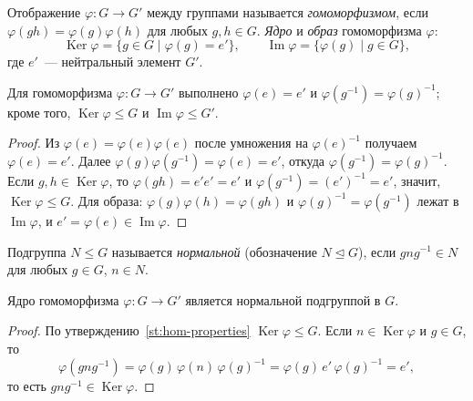 \documentclass[12pt]{article}
\begin{document}
	\begin{definition}\label{def:homomorphism}
		Отображение $\varphi: G \to G'$ между группами называется \emph{гомоморфизмом}, если $\varphi(gh) = \varphi(g)\varphi(h)$ для любых $g, h \in G$. \emph{Ядро} и \emph{образ} гомоморфизма $\varphi$:
		\[
			\operatorname{Ker}\varphi = \{ g \in G \mid \varphi(g) = e' \}, \qquad \operatorname{Im}\varphi = \{ \varphi(g) \mid g \in G \},
		\]
		где $e'$~--- нейтральный элемент $G'$.
	\end{definition}

	\begin{statement}\label{st:hom-properties}
		Для гомоморфизма $\varphi: G \to G'$ выполнено $\varphi(e) = e'$ и $\varphi(g^{-1}) = \varphi(g)^{-1}$; кроме того, $\operatorname{Ker}\varphi \leqslant G$ и $\operatorname{Im}\varphi \leqslant G'$.
	\end{statement}

	\begin{proof}
		Из $\varphi(e) = \varphi(e)\varphi(e)$ после умножения на $\varphi(e)^{-1}$ получаем $\varphi(e) = e'$. Далее $\varphi(g)\varphi(g^{-1}) = \varphi(e) = e'$, откуда $\varphi(g^{-1}) = \varphi(g)^{-1}$. Если $g, h \in \operatorname{Ker}\varphi$, то $\varphi(gh) = e'e' = e'$ и $\varphi(g^{-1}) = (e')^{-1} = e'$, значит, $\operatorname{Ker}\varphi \leqslant G$. Для образа: $\varphi(g)\varphi(h) = \varphi(gh)$ и $\varphi(g)^{-1} = \varphi(g^{-1})$ лежат в $\operatorname{Im}\varphi$, и $e' = \varphi(e) \in \operatorname{Im}\varphi$.
	\end{proof}

	\begin{definition}\label{def:normal}
		Подгруппа $N \leqslant G$ называется \emph{нормальной} (обозначение $N \trianglelefteq G$), если $gng^{-1} \in N$ для любых $g \in G$, $n \in N$.
	\end{definition}

	\begin{theorem}\label{thm:kernel-normal}
		Ядро гомоморфизма $\varphi: G \to G'$ является нормальной подгруппой в $G$.
	\end{theorem}

	\begin{proof}
		По утверждению~\ref{st:hom-properties} $\operatorname{Ker}\varphi \leqslant G$. Если $n \in \operatorname{Ker}\varphi$ и $g \in G$, то
		\[
			\varphi(gng^{-1}) = \varphi(g)\,\varphi(n)\,\varphi(g)^{-1} = \varphi(g)\,e'\,\varphi(g)^{-1} = e',
		\]
		то есть $gng^{-1} \in \operatorname{Ker}\varphi$.
	\end{proof}
\end{document}
